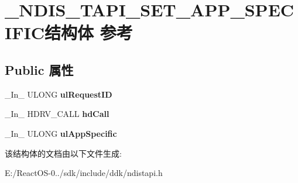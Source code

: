 \hypertarget{struct___n_d_i_s___t_a_p_i___s_e_t___a_p_p___s_p_e_c_i_f_i_c}{}\section{\+\_\+\+N\+D\+I\+S\+\_\+\+T\+A\+P\+I\+\_\+\+S\+E\+T\+\_\+\+A\+P\+P\+\_\+\+S\+P\+E\+C\+I\+F\+I\+C结构体 参考}
\label{struct___n_d_i_s___t_a_p_i___s_e_t___a_p_p___s_p_e_c_i_f_i_c}
\subsection*{Public 属性}
\begin{DoxyCompactItemize}
\item 
\mbox{\label{struct___n_d_i_s___t_a_p_i___s_e_t___a_p_p___s_p_e_c_i_f_i_c_a593ea45d82059403d075bd7fb7c741af}} 
\+\_\+\+In\+\_\+ U\+L\+O\+NG {\bfseries ul\+Request\+ID}
\item 
\mbox{\label{struct___n_d_i_s___t_a_p_i___s_e_t___a_p_p___s_p_e_c_i_f_i_c_aa941350ea9c3400312e196a62b4f4562}} 
\+\_\+\+In\+\_\+ H\+D\+R\+V\+\_\+\+C\+A\+LL {\bfseries hd\+Call}
\item 
\mbox{\label{struct___n_d_i_s___t_a_p_i___s_e_t___a_p_p___s_p_e_c_i_f_i_c_a5711691e1cebfe78be78cd5f651b2896}} 
\+\_\+\+In\+\_\+ U\+L\+O\+NG {\bfseries ul\+App\+Specific}
\end{DoxyCompactItemize}


该结构体的文档由以下文件生成\+:\begin{DoxyCompactItemize}
\item 
E\+:/\+React\+O\+S-\/0../sdk/include/ddk/ndistapi.\+h\end{DoxyCompactItemize}
